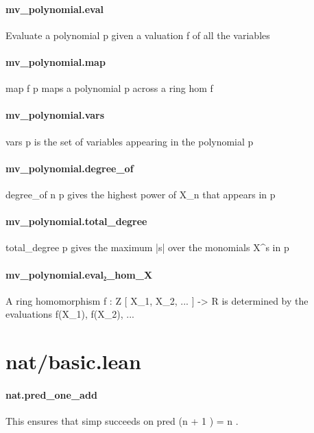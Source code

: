\documentclass{article}
\begin{document}
\paragraph{mv\_polynomial.eval}
\par
Evaluate a polynomial 
\colorbox[RGB]{253,246,227}{{{{\color[RGB]{101, 123, 131} p }}}} given a valuation 
\colorbox[RGB]{253,246,227}{{{{\color[RGB]{101, 123, 131} f }}}} of all the variables
\paragraph{mv\_polynomial.map}
\par
\colorbox[RGB]{253,246,227}{{{{\color[RGB]{101, 123, 131} map f p }}}} maps a polynomial 
\colorbox[RGB]{253,246,227}{{{{\color[RGB]{101, 123, 131} p }}}} across a ring hom 
\colorbox[RGB]{253,246,227}{{{{\color[RGB]{101, 123, 131} f }}}}\paragraph{mv\_polynomial.vars}
\par
\colorbox[RGB]{253,246,227}{{{{\color[RGB]{101, 123, 131} vars p }}}} is the set of variables appearing in the polynomial 
\colorbox[RGB]{253,246,227}{{{{\color[RGB]{101, 123, 131} p }}}}\paragraph{mv\_polynomial.degree\_of}
\par
\colorbox[RGB]{253,246,227}{{{{\color[RGB]{101, 123, 131} degree\_of n p }}}} gives the highest power of X\_n that appears in 
\colorbox[RGB]{253,246,227}{{{{\color[RGB]{101, 123, 131} p }}}}\paragraph{mv\_polynomial.total\_degree}
\par
\colorbox[RGB]{253,246,227}{{{{\color[RGB]{101, 123, 131} total\_degree p }}}} gives the maximum |s| over the monomials X\textasciicircum{}s in 
\colorbox[RGB]{253,246,227}{{{{\color[RGB]{101, 123, 131} p }}}}\paragraph{mv\_polynomial.eval₂\_hom\_X}
\par
A ring homomorphism f : Z
{[}
X\_1, X\_2, ...
{]}
 -> R
is determined by the evaluations f(X\_1), f(X\_2), ...
\section{nat/basic.lean}\paragraph{nat.pred\_one\_add}
\par
This ensures that 
\colorbox[RGB]{253,246,227}{{{{\color[RGB]{101, 123, 131} simp }}}} succeeds on 
\colorbox[RGB]{253,246,227}{{{{\color[RGB]{101, 123, 131} pred (n  }}}{{{\color[RGB]{181, 137, 0} + }}}{{{\color[RGB]{101, 123, 131}   }}}{{{\color[RGB]{108, 113, 196} 1 }}}{{{\color[RGB]{101, 123, 131} )  }}}{{{\color[RGB]{181, 137, 0} = }}}{{{\color[RGB]{101, 123, 131}  n }}}}.
\end{document}
